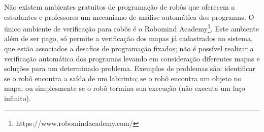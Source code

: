 


Não existem ambientes gratuitos de programação de robôs que oferecem a estudantes e professores um mecanismo de análise automática dos programas. O único ambiente de verificação para robôs é o Robomind Academy\footnote[2]{https://www.robomindacademy.com/}. Este ambiente além de ser pago, só permite a verificação dos mapas já cadastrados no sistema, que estão associados a desafios de programação fixados; não é possível realizar a verificação automática dos programas levando em consideração diferentes mapas e soluções para um determinado problema. Exemplos de problemas são: identificar se o robô encontra a saída de um labirinto; se o robô encontra um objeto no mapa; ou simplesmente se o robô termina sua execução (não executa um laço infinito).




